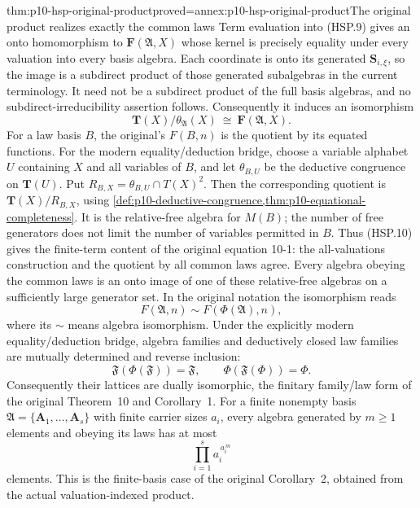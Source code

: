 \begin{hbtheorem}{thm:p10-hsp-original-product}{proved=annex:p10-hsp-original-product}{The original product realizes exactly the common laws}
Term evaluation into (HSP.9) gives an onto homomorphism to
\(\mathbf F(\mathfrak A,X)\) whose kernel is precisely
equality under every valuation into every basis algebra.
Each coordinate is onto its generated \(\mathbf S_{i,\xi}\),
so the image is a subdirect product of those generated
subalgebras in the current terminology. It need not be a
subdirect product of the full basis algebras, and no
subdirect-irreducibility assertion follows.
Consequently it induces an isomorphism
\[
 \mathbf T(X)/\theta_{\mathfrak A}(X)
             \ \cong\ \mathbf F(\mathfrak A,X).
 \tag{HSP.10}
\]
For a law basis \(B\), the original's \(F(B,n)\) is the quotient
by its equated functions. For the modern equality/deduction bridge,
choose a variable alphabet \(U\) containing \(X\) and all variables
of \(B\), and let \(\theta_{B,U}\) be the deductive congruence
on \(\mathbf T(U)\).
Put \(R_{B,X}=\theta_{B,U}\cap T(X)^2\).
Then the corresponding quotient is
\(\mathbf T(X)/R_{B,X}\), using
\cref{def:p10-deductive-congruence,thm:p10-equational-completeness}.
It is the relative-free algebra for \(M(B)\); the number of free
generators does not limit the number of variables permitted in \(B\).
Thus (HSP.10) gives the finite-term content of the original
equation 10-1: the all-valuations construction and the quotient
by all common laws agree. Every algebra obeying the common laws
is an onto image of one of these relative-free algebras on a
sufficiently large generator set.
In the original notation the isomorphism reads
\[
 F(\mathfrak A,n)\sim F(\Phi(\mathfrak A),n),
 \tag{1935.10-1}
\]
where its \(\sim\) means algebra isomorphism.
Under the explicitly modern equality/deduction bridge,
algebra families and deductively closed law families are
mutually determined and reverse inclusion:
\[
 \mathfrak F(\Phi(\mathfrak F))=\mathfrak F,\qquad
 \Phi(\mathfrak F(\Phi))=\Phi.
 \tag{HSP.11}
\]
Consequently their lattices are dually isomorphic, the finitary
family/law form of the original Theorem~10 and Corollary~1.
For a finite nonempty basis
\(\mathfrak A=\{\mathbf A_1,\ldots,\mathbf A_s\}\)
with finite carrier sizes \(a_i\), every algebra generated
by \(m\geq1\) elements and obeying its laws has at most
\[
 \prod_{i=1}^{s} a_i^{\,a_i^{\,m}}
 \tag{HSP.12}
\]
elements. This is the finite-basis case of the original
Corollary~2, obtained from the actual valuation-indexed product.
\end{hbtheorem}


